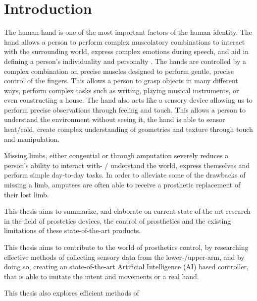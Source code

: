 \documentclass[../main.tex]{subfiles}
\begin{document}
\section{Introduction}

The human hand is one of the most important factors of the human identity.
The hand allows a person  to perform complex muscolatory combinations to interact with the surrounding world, express complex emotions during speech, and aid in defining a person's individuality and personalty \cite{???}.
The hands are controlled by a complex combination on precise muscles designed to perform gentle, precise control of the fingers.
This allows a person to grasp objects in many different ways, perform complex tasks such as writing, playing musical instruments, or even constructing a house.
The hand also acts like a sensory device allowing us to perform precise observations through feeling and touch.
This allows a person to understand the environment without seeing it, the hand is able to sensor heat/cold, create complex understanding of geometries and texture through touch and manipulation.

Missing limbs, either \gls{congential} or through amputation severely reduces a person's ability to interact with- / understand the world, express themselves and perform simple day-to-day tasks.
In order to alleviate some of the drawbacks of missing a limb, amputees are often able to receive a prosthetic replacement of their lost limb.

This thesis aims to summarize, and elaborate on current state-of-the-art research in the field of prostetics devices, the control of prosthetics and the existing limitations of these state-of-the-art products. 

This thesis aims to contribute to the world of prosthetics control, by researching effective methods of collecting sensory data from the lower-/upper-arm, and by doing so, creating an state-of-the-art Artificial Intelligence (AI) based controller, that is able to imitate the intent and movements or a real hand.


This thesis also explores efficient methods of 
\end{document}
